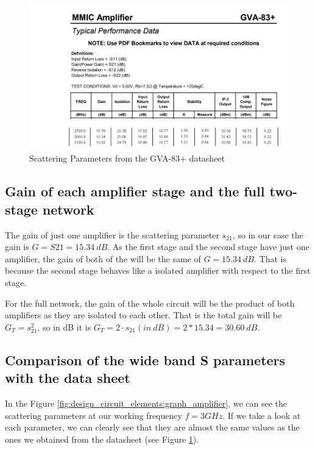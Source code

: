 \documentclass[12pt]{report} %
\begin{document}
\begin{figure}[htbp]
    \centering
    \includegraphics[width=\textwidth]{images/design_circuit_elements/scattering_parameters_datasheet.png}
    \caption{Scattering Parameters from the GVA-83+ datasheet}
    \label{fig:design_circuit_elements:scattering_parameters_datasheet}
\end{figure}

\subsection{Gain of each amplifier stage and the full two-stage network}
\label{subsec:gain_each_amplifier_and_full_two_stage}

The gain of just one amplifier is the scattering parameter $s_{21}$, so in our case the gain is $G = S{21} = 15.34 \ dB$. As the first stage and the second stage have just one amplifier, the gain of both of the will be the same of $G = 15.34 \ dB$. That is because the second stage behaves like a isolated amplifier with respect to the first stage.

For the full network, the gain of the whole circuit will be the product of both amplifiers as they are isolated to each other. That is the total gain will be $G_T = s_{21}^2$, so in dB it is $G_T = 2 \cdot s_{21} (in \ dB) = 2 * 15.34 = 30.60 \ dB$.

\subsection{Comparison of the wide band S parameters with the data sheet}

In the Figure \ref{fig:design_circuit_elements:graph_amplifier}, we can see the scattering parameters at our working frequency $f = 3 GHz$. If we take a look at each parameter, we can clearly see that they are almost the same values as the ones we obtained from the datasheet (see Figure \ref{fig:design_circuit_elements:scattering_parameters_datasheet}).
\end{document}
